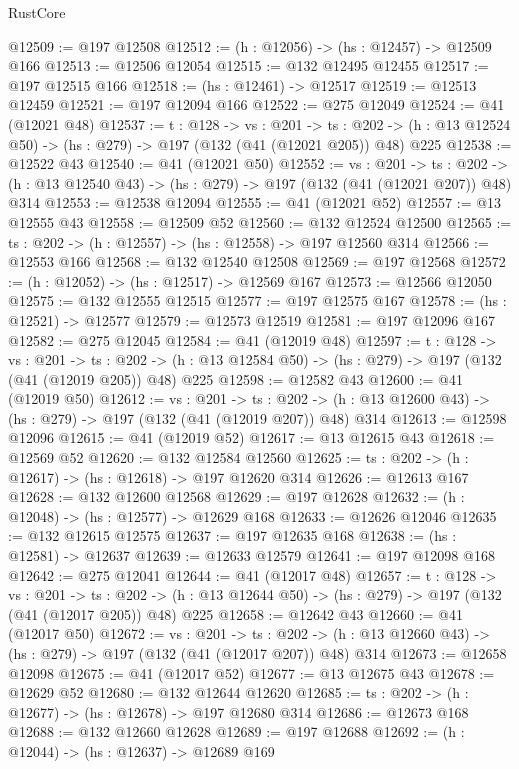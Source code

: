 \begin{lexlean}{RustCore}
\begin{coremodule}
@12509 := @197 @12508
@12512 := (h : @12056) -> (hs : @12457) -> @12509 @166
@12513 := @12506 @12054
@12515 := @132 @12495 @12455
@12517 := @197 @12515 @166
@12518 := (hs : @12461) -> @12517
@12519 := @12513 @12459
@12521 := @197 @12094 @166
@12522 := @275 @12049
@12524 := @41 (@12021 @48)
@12537 := {t : @128} ->
  {vs : @201} ->
  {ts : @202} -> (h : @13 @12524 @50) -> (hs : @279) -> @197 (@132 (@41 (@12021 @205)) @48) @225
@12538 := @12522 @43
@12540 := @41 (@12021 @50)
@12552 := {vs : @201} ->
  {ts : @202} -> (h : @13 @12540 @43) -> (hs : @279) -> @197 (@132 (@41 (@12021 @207)) @48) @314
@12553 := @12538 @12094
@12555 := @41 (@12021 @52)
@12557 := @13 @12555 @43
@12558 := @12509 @52
@12560 := @132 @12524 @12500
@12565 := {ts : @202} -> (h : @12557) -> (hs : @12558) -> @197 @12560 @314
@12566 := @12553 @166
@12568 := @132 @12540 @12508
@12569 := @197 @12568
@12572 := (h : @12052) -> (hs : @12517) -> @12569 @167
@12573 := @12566 @12050
@12575 := @132 @12555 @12515
@12577 := @197 @12575 @167
@12578 := (hs : @12521) -> @12577
@12579 := @12573 @12519
@12581 := @197 @12096 @167
@12582 := @275 @12045
@12584 := @41 (@12019 @48)
@12597 := {t : @128} ->
  {vs : @201} ->
  {ts : @202} -> (h : @13 @12584 @50) -> (hs : @279) -> @197 (@132 (@41 (@12019 @205)) @48) @225
@12598 := @12582 @43
@12600 := @41 (@12019 @50)
@12612 := {vs : @201} ->
  {ts : @202} -> (h : @13 @12600 @43) -> (hs : @279) -> @197 (@132 (@41 (@12019 @207)) @48) @314
@12613 := @12598 @12096
@12615 := @41 (@12019 @52)
@12617 := @13 @12615 @43
@12618 := @12569 @52
@12620 := @132 @12584 @12560
@12625 := {ts : @202} -> (h : @12617) -> (hs : @12618) -> @197 @12620 @314
@12626 := @12613 @167
@12628 := @132 @12600 @12568
@12629 := @197 @12628
@12632 := (h : @12048) -> (hs : @12577) -> @12629 @168
@12633 := @12626 @12046
@12635 := @132 @12615 @12575
@12637 := @197 @12635 @168
@12638 := (hs : @12581) -> @12637
@12639 := @12633 @12579
@12641 := @197 @12098 @168
@12642 := @275 @12041
@12644 := @41 (@12017 @48)
@12657 := {t : @128} ->
  {vs : @201} ->
  {ts : @202} -> (h : @13 @12644 @50) -> (hs : @279) -> @197 (@132 (@41 (@12017 @205)) @48) @225
@12658 := @12642 @43
@12660 := @41 (@12017 @50)
@12672 := {vs : @201} ->
  {ts : @202} -> (h : @13 @12660 @43) -> (hs : @279) -> @197 (@132 (@41 (@12017 @207)) @48) @314
@12673 := @12658 @12098
@12675 := @41 (@12017 @52)
@12677 := @13 @12675 @43
@12678 := @12629 @52
@12680 := @132 @12644 @12620
@12685 := {ts : @202} -> (h : @12677) -> (hs : @12678) -> @197 @12680 @314
@12686 := @12673 @168
@12688 := @132 @12660 @12628
@12689 := @197 @12688
@12692 := (h : @12044) -> (hs : @12637) -> @12689 @169

\end{coremodule}
\end{lexlean}
